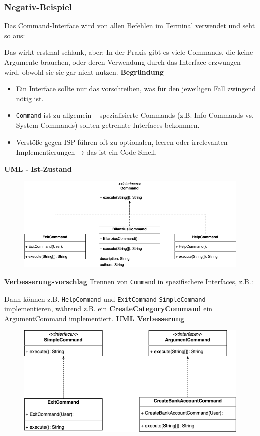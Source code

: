 \subsubsection*{Negativ-Beispiel}
Das Command-Interface wird von allen Befehlen im Terminal verwendet und seht so aus:

Das wirkt erstmal schlank, aber: In der Praxis gibt es viele Commands, die keine Argumente brauchen, oder deren Verwendung durch das Interface erzwungen wird, obwohl sie sie gar nicht nutzen.
\textbf{Begründung}
\begin{itemize}
    \item Ein Interface sollte nur das vorschreiben, was für den jeweiligen Fall zwingend nötig ist.
    \item \texttt{Command} ist zu allgemein – spezialisierte Commands (z.B. Info-Commands vs. System-Commands) sollten getrennte Interfaces bekommen.
    \item Verstöße gegen ISP führen oft zu optionalen, leeren oder irrelevanten Implementierungen → das ist ein Code-Smell.
\end{itemize}
\textbf{UML - Ist-Zustand}\newline
\begin{figure}[htbp]
    \centering
    \includegraphics[width=\linewidth]{kapitel3_solid/ISP_negative_Command.drawio.png}
\end{figure}
\newline
\textbf{Verbesserungsvorschlag}\newline
Trennen von \texttt{Command} in spezifischere Interfaces, z.B.:

Dann können z.B. \texttt{HelpCommand} und \texttt{ExitCommand} \texttt{SimpleCommand} implementieren, während z.B. ein \textbf{CreateCategoryCommand} ein ArgumentCommand implementiert.\newline\newline
\textbf{UML Verbesserung}
\begin{figure}[htbp]
    \centering
    \includegraphics[width=\linewidth]{kapitel3_solid/ISP_negative_BetterCommand.drawio.png}
\end{figure}